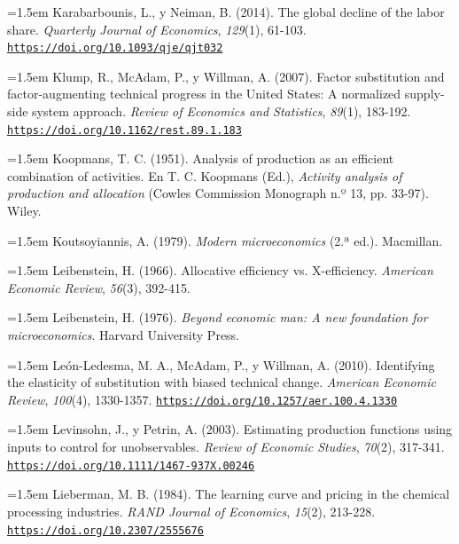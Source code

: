 \documentclass[10pt,a4paper]{article}
\begin{document}
\noindent\hangindent=1.5em Karabarbounis, L., y Neiman, B. (2014). The global decline of the labor share. \textit{Quarterly Journal of Economics}, \textit{129}(1), 61-103. \href{https://doi.org/10.1093/qje/qjt032}{\nolinkurl{https://doi.org/10.1093/qje/qjt032}}

\noindent\hangindent=1.5em Klump, R., McAdam, P., y Willman, A. (2007). Factor substitution and factor-augmenting technical progress in the United States: A normalized supply-side system approach. \textit{Review of Economics and Statistics}, \textit{89}(1), 183-192. \href{https://doi.org/10.1162/rest.89.1.183}{\nolinkurl{https://doi.org/10.1162/rest.89.1.183}}

\noindent\hangindent=1.5em Koopmans, T. C. (1951). Analysis of production as an efficient combination of activities. En T. C. Koopmans (Ed.), \textit{Activity analysis of production and allocation} (Cowles Commission Monograph n.º 13, pp. 33-97). Wiley.

\noindent\hangindent=1.5em Koutsoyiannis, A. (1979). \textit{Modern microeconomics} (2.ª ed.). Macmillan.

\noindent\hangindent=1.5em Leibenstein, H. (1966). Allocative efficiency vs. X-efficiency. \textit{American Economic Review}, \textit{56}(3), 392-415.

\noindent\hangindent=1.5em Leibenstein, H. (1976). \textit{Beyond economic man: A new foundation for microeconomics}. Harvard University Press.

\noindent\hangindent=1.5em León-Ledesma, M. A., McAdam, P., y Willman, A. (2010). Identifying the elasticity of substitution with biased technical change. \textit{American Economic Review}, \textit{100}(4), 1330-1357. \href{https://doi.org/10.1257/aer.100.4.1330}{\nolinkurl{https://doi.org/10.1257/aer.100.4.1330}}

\noindent\hangindent=1.5em Levinsohn, J., y Petrin, A. (2003). Estimating production functions using inputs to control for unobservables. \textit{Review of Economic Studies}, \textit{70}(2), 317-341. \href{https://doi.org/10.1111/1467-937X.00246}{\nolinkurl{https://doi.org/10.1111/1467-937X.00246}}

\noindent\hangindent=1.5em Lieberman, M. B. (1984). The learning curve and pricing in the chemical processing industries. \textit{RAND Journal of Economics}, \textit{15}(2), 213-228. \href{https://doi.org/10.2307/2555676}{\nolinkurl{https://doi.org/10.2307/2555676}}
\end{document}
